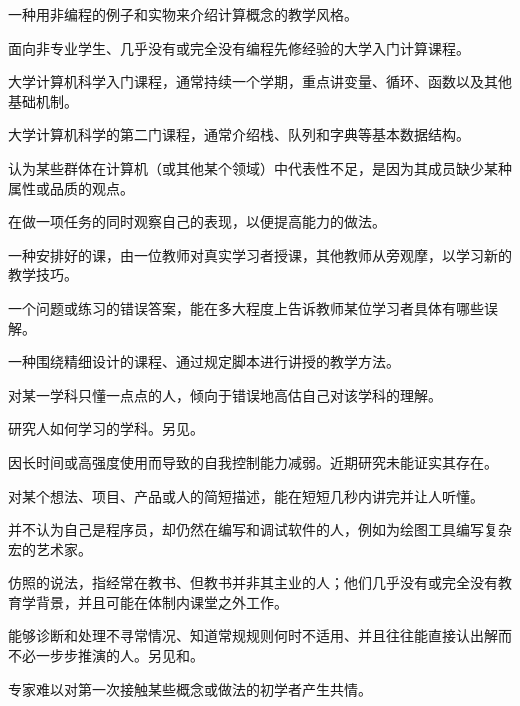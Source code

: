 \begin{description}
 一种用非编程的例子和实物来介绍计算概念的教学风格。

 面向非专业学生、几乎没有或完全没有编程先修经验的大学入门计算课程。

 大学计算机科学入门课程，通常持续一个学期，重点讲变量、循环、函数以及其他基础机制。

 大学计算机科学的第二门课程，通常介绍栈、队列和字典等基本数据结构。

 认为某些群体在计算机（或其他某个领域）中代表性不足，是因为其成员缺少某种属性或品质的观点。

 在做一项任务的同时观察自己的表现，以便提高能力的做法。

 一种安排好的课，由一位教师对真实学习者授课，其他教师从旁观摩，以学习新的教学技巧。

 一个问题或练习的错误答案，能在多大程度上告诉教师某位学习者具体有哪些误解。

 一种围绕精细设计的课程、通过规定脚本进行讲授的教学方法。

 对某一学科只懂一点点的人，倾向于错误地高估自己对该学科的理解。

 研究人如何学习的学科。另见。

 因长时间或高强度使用而导致的自我控制能力减弱。近期研究未能证实其存在。

 对某个想法、项目、产品或人的简短描述，能在短短几秒内讲完并让人听懂。

 并不认为自己是程序员，却仍然在编写和调试软件的人，例如为绘图工具编写复杂宏的艺术家。

 仿照的说法，指经常在教书、但教书并非其主业的人；他们几乎没有或完全没有教育学背景，并且可能在体制内课堂之外工作。

 能够诊断和处理不寻常情况、知道常规规则何时不适用、并且往往能直接认出解而不必一步步推演的人。另见和。

 专家难以对第一次接触某些概念或做法的初学者产生共情。


\end{description}
